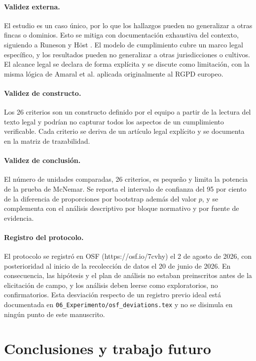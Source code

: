 \documentclass[pdflatex,sn-mathphys-num]{sn-jnl}
\begin{document}
\paragraph{Validez externa.} El estudio es un caso \'unico, por lo que los hallazgos pueden no generalizar a otras fincas o dominios. Esto se mitiga con documentaci\'on exhaustiva del contexto, siguiendo a Runeson y H\"ost \cite{runeson2009}. El modelo de cumplimiento cubre un marco legal espec\'ifico, y los resultados pueden no generalizar a otras jurisdicciones o cultivos. El alcance legal se declara de forma expl\'icita y se discute como limitaci\'on, con la misma l\'ogica de Amaral et al. \cite{amaral2021} aplicada originalmente al RGPD europeo.

\paragraph{Validez de constructo.} Los 26 criterios son un constructo definido por el equipo a partir de la lectura del texto legal y podr\'ian no capturar todos los aspectos de un cumplimiento verificable. Cada criterio se deriva de un art\'iculo legal expl\'icito y se documenta en la matriz de trazabilidad.

\paragraph{Validez de conclusi\'on.} El n\'umero de unidades comparadas, 26 criterios, es peque\~no y limita la potencia de la prueba de McNemar. Se reporta el intervalo de confianza del 95 por ciento de la diferencia de proporciones por bootstrap adem\'as del valor $p$, y se complementa con el an\'alisis descriptivo por bloque normativo y por fuente de evidencia.

\paragraph{Registro del protocolo.} El protocolo se registr\'o en OSF (https://osf.io/7cvhy) el 2 de agosto de 2026, con posterioridad al inicio de la recolecci\'on de datos el 20 de junio de 2026. En consecuencia, las hip\'otesis y el plan de an\'alisis no estaban preinscritos antes de la elicitaci\'on de campo, y los an\'alisis deben leerse como exploratorios, no confirmatorios. Esta desviaci\'on respecto de un registro previo ideal est\'a documentada en \texttt{06\_Experimento/osf\_deviations.tex} y no se disimula en ning\'un punto de este manuscrito.

\section{Conclusiones y trabajo futuro}\label{sec:conclusiones}
\end{document}
